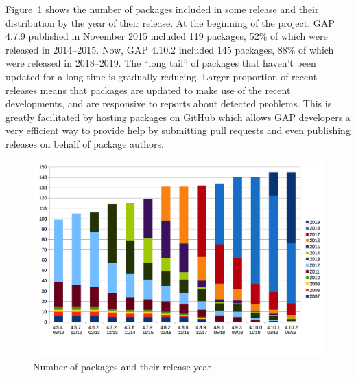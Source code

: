 \documentclass{deliverablereport}
\begin{document}
Figure~\ref{fig:gap-package-releases} shows the number of \GAP packages
included in some \GAP release and their distribution by the year of their
release. At the beginning of the project, GAP 4.7.9 published in November
2015 included 119 packages, 52\% of which were released in 2014--2015.
Now, GAP 4.10.2 included 145 packages, 88\% of which were released in
2018--2019. The ``long tail'' of packages that haven't been updated for
a long time is gradually reducing.
Larger proportion of recent releases means that 
packages are updated to make use of the recent \GAP developments,
and are responsive to reports about detected problems.
This is greatly facilitated by hosting packages on GitHub which 
allows GAP developers a very efficient way to provide help by submitting 
pull requests and even publishing releases on behalf of package authors.

\begin{figure}[!ht]
    \centering
    \includegraphics[width=\textwidth]{images/gap-package-releases}
    \caption{Number of \GAP packages and their release year}
    \label{fig:gap-package-releases}
\end{figure}
\end{document}
